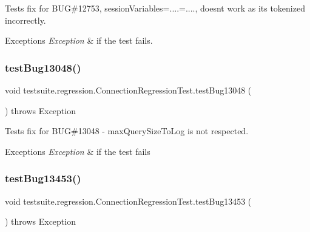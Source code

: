 Tests fix for B\+UG\#12753, session\+Variables=....=...., doesn\textquotesingle{}t work as it\textquotesingle{}s tokenized incorrectly.


\begin{DoxyExceptions}{Exceptions}
{\em Exception} & if the test fails. \\
\hline
\end{DoxyExceptions}
\mbox{\label{classtestsuite_1_1regression_1_1_connection_regression_test_a4a84b1ea9f0518f341a3588f6c999033}} 
\subsubsection{\texorpdfstring{test\+Bug13048()}{testBug13048()}}
{\footnotesize\ttfamily void testsuite.\+regression.\+Connection\+Regression\+Test.\+test\+Bug13048 (\begin{DoxyParamCaption}{ }\end{DoxyParamCaption}) throws Exception}

Tests fix for B\+UG\#13048 -\/ max\+Query\+Size\+To\+Log is not respected.


\begin{DoxyExceptions}{Exceptions}
{\em Exception} & if the test fails \\
\hline
\end{DoxyExceptions}
\mbox{\label{classtestsuite_1_1regression_1_1_connection_regression_test_af142c9614c193db02b2b9856d109b2ec}} 
\subsubsection{\texorpdfstring{test\+Bug13453()}{testBug13453()}}
{\footnotesize\ttfamily void testsuite.\+regression.\+Connection\+Regression\+Test.\+test\+Bug13453 (\begin{DoxyParamCaption}{ }\end{DoxyParamCaption}) throws Exception}

